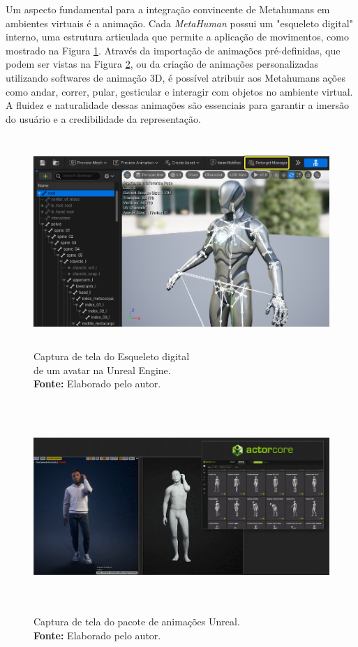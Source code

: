 Um aspecto fundamental para a integração convincente de Metahumans em ambientes virtuais é a animação. Cada \textit{MetaHuman} possui um "esqueleto digital" interno, uma estrutura articulada que permite a aplicação de movimentos, como mostrado na Figura \ref{fig:skeleton}. Através da importação de animações pré-definidas, que podem ser vistas na Figura \ref{fig:animacoes}, ou da criação de animações personalizadas utilizando softwares de animação 3D, é possível atribuir aos Metahumans ações como andar, correr, pular, gesticular e interagir com objetos no ambiente virtual. A fluidez e naturalidade dessas animações são essenciais para garantir a imersão do usuário e a credibilidade da representação.

\begin{figure}[H]
    \centering
    \includegraphics[height=8cm, keepaspectratio]{img/skeleton.png}
    \caption{Captura de tela do Esqueleto digital \\de um avatar na Unreal Engine.\\
        \textbf{Fonte:} Elaborado pelo autor.}
    \label{fig:skeleton}
\end{figure}

\begin{figure}[H]
    \centering
    \includegraphics[height=8cm, keepaspectratio]{gif/animacoes/feature_body_motion-0000.jpg}
    \caption{ Captura de tela do pacote de animações Unreal.\\
        \textbf{Fonte:} Elaborado pelo autor.}
    \label{fig:animacoes}
\end{figure}



